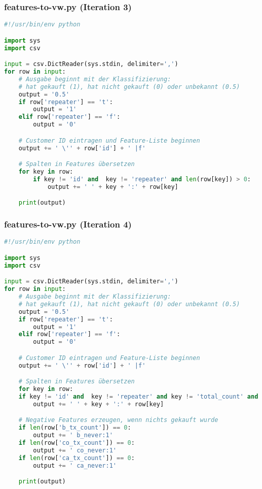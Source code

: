 \subsubsection{features-to-vw.py (Iteration 3)}
\label{code:features-to-vw}
\begin{lstlisting}[language=Python]
#!/usr/bin/env python

import sys
import csv

input = csv.DictReader(sys.stdin, delimiter=',')
for row in input:
	# Ausgabe beginnt mit der Klassifizierung:
	# hat gekauft (1), hat nicht gekauft (0) oder unbekannt (0.5)
	output = '0.5'
	if row['repeater'] == 't':
		output = '1'
	elif row['repeater'] == 'f':
		output = '0'

	# Customer ID eintragen und Feature-Liste beginnen
	output += ' \'' + row['id'] + ' |f'

	# Spalten in Features übersetzen
	for key in row:
		if key != 'id' and  key != 'repeater' and len(row[key]) > 0:
			output += ' ' + key + ':' + row[key]

	print(output)
\end{lstlisting}

\subsubsection{features-to-vw.py (Iteration 4)}
\label{code:features-to-vw-4}
\begin{lstlisting}[language=Python]
#!/usr/bin/env python

import sys
import csv

input = csv.DictReader(sys.stdin, delimiter=',')
for row in input:
    # Ausgabe beginnt mit der Klassifizierung:
    # hat gekauft (1), hat nicht gekauft (0) oder unbekannt (0.5)
    output = '0.5'
    if row['repeater'] == 't':
        output = '1'
    elif row['repeater'] == 'f':
        output = '0'

    # Customer ID eintragen und Feature-Liste beginnen
    output += ' \'' + row['id'] + ' |f'

    # Spalten in Features übersetzen
    for key in row:
    if key != 'id' and  key != 'repeater' and key != 'total_count' and key != 'total_spent' and len(row[key]) > 0:
        output += ' ' + key + ':' + row[key]

    # Negative Features erzeugen, wenn nichts gekauft wurde
    if len(row['b_tx_count']) == 0:
        output += ' b_never:1'
    if len(row['co_tx_count']) == 0:
        output += ' co_never:1'
    if len(row['ca_tx_count']) == 0:
        output += ' ca_never:1'

    print(output)
\end{lstlisting}

